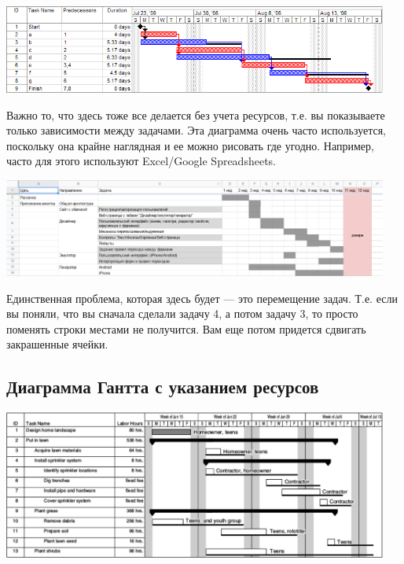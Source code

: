 \documentclass{../../text-style}
\begin{document}
\begin{center}
    \includegraphics[width=0.95\textwidth]{ganttChart.png}
\end{center}

Важно то, что здесь тоже все делается без учета ресурсов, т.е. вы показываете только зависимости между задачами. Эта диаграмма очень часто используется, поскольку она крайне наглядная и ее можно рисовать где угодно. Например, часто для этого используют Excel/Google Spreadsheets. 

\begin{center}
    \includegraphics[width=0.95\textwidth]{ganttChartExample.png}
\end{center}

Единственная проблема, которая здесь будет --- это перемещение задач. Т.е. если вы поняли, что вы сначала сделали задачу 4, а потом задачу 3, то просто поменять строки местами не получится. Вам еще потом придется сдвигать закрашенные ячейки.

\subsection{Диаграмма Гантта с указанием ресурсов}

\begin{center}
    \includegraphics[width=0.95\textwidth]{ganttChartWithResources.png}
\end{center}
\end{document}
